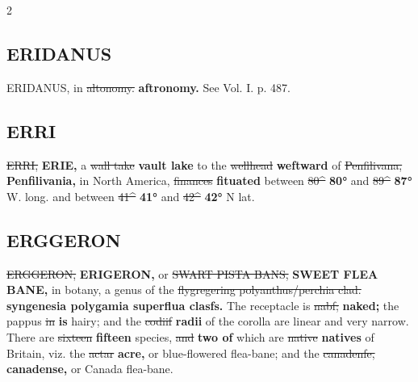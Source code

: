 \documentclass[10pt]{article}
\begin{document}
\begin{multicols}{2}
\subsection*{ERIDANUS}
ERIDANUS, in \sout{altonomy.} \textbf{aftronomy.} See Vol. I. p. 487.

\subsection*{ERRI}
\sout{ERRI,} \textbf{ERIE,} a \sout{wall take} \textbf{vault lake} to the \sout{wellhead} \textbf{weftward} of \sout{Penfilivana,} \textbf{Penfilivania,} in North America, \sout{finances} \textbf{fituated} between \sout{80\textasciicircum{}} \textbf{80°} and \sout{89\textasciicircum{}} \textbf{87°} W. long. and between \sout{41\textasciicircum{}} \textbf{41°} and \sout{42\textasciicircum{}} \textbf{42°} N lat.

\subsection*{ERGGERON}
\sout{ERGGERON,} \textbf{ERIGERON,} or \sout{SWART PISTA BANS,} \textbf{SWEET FLEA BANE,} in botany, a genus of the \sout{flygregering polyanthus/perchia clad.} \textbf{syngenesia polygamia superflua clasfs.} The receptacle is \sout{nabf;} \textbf{naked;} the pappus \sout{in} \textbf{is} hairy; and the \sout{codiif} \textbf{radii} of the corolla are linear and very narrow. There are \sout{sixteen} \textbf{fifteen} species, \sout{and} \textbf{two of} which are \sout{native} \textbf{natives} of Britain, viz. the \sout{actar} \textbf{acre,} or blue-flowered flea-bane; and the \sout{canadenfe,} \textbf{canadense,} or Canada flea-bane.


\end{multicols}
\end{document}
